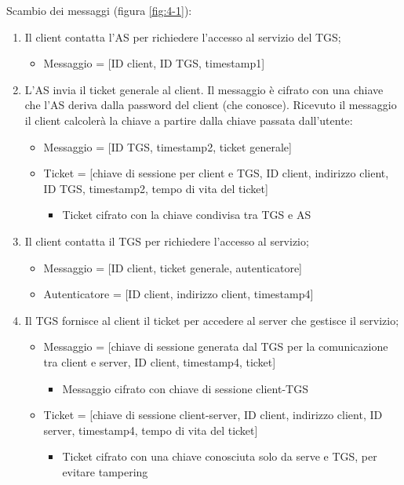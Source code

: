 Scambio dei messaggi (figura \ref{fig:4-1}):
\begin{enumerate}
    \item Il client contatta l'AS per richiedere l'accesso al servizio del TGS;
	\begin{itemize}
	    \item Messaggio = [ID client, ID TGS, timestamp1]
	\end{itemize}
	\item L'AS invia il ticket generale al client. Il messaggio è cifrato con una chiave che l'AS deriva dalla password del client (che conosce). Ricevuto il messaggio il client calcolerà la chiave a partire dalla chiave passata dall'utente: 
	\begin{itemize}
	    \item Messaggio = [ID TGS, timestamp2, ticket generale]
		\item Ticket = [chiave di sessione per client e TGS, ID client, indirizzo client, ID TGS, timestamp2, tempo di vita del ticket]
		\begin{itemize}
		    \item Ticket cifrato con la chiave condivisa tra TGS e AS
		\end{itemize}
	\end{itemize}
	\item Il client contatta il TGS per richiedere l'accesso al servizio;
	\begin{itemize}
	    \item Messaggio = [ID client, ticket generale, autenticatore]
		\item Autenticatore = [ID client, indirizzo client, timestamp4]
	\end{itemize}
	\item Il TGS fornisce al client il ticket per accedere al server che gestisce il servizio;
	\begin{itemize}
	    \item Messaggio = [chiave di sessione generata dal TGS per la comunicazione tra client e server, ID client, timestamp4, ticket]
		\begin{itemize}
		    \item Messaggio cifrato con chiave di sessione client-TGS
		\end{itemize}
		\item Ticket = [chiave di sessione client-server, ID client, indirizzo client, ID server, timestamp4, tempo di vita del ticket]
		\begin{itemize}
		    \item Ticket cifrato con una chiave conosciuta solo da serve e TGS, per evitare tampering

\end{itemize}
\end{itemize}
\end{enumerate}
